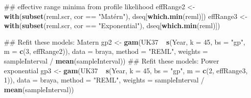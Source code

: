 \documentclass[12pt,]{article}
\newenvironment{Shaded}{\begin{snugshade}}{\end{snugshade}}
\newcommand{\KeywordTok}[1]{\textcolor[rgb]{0.13,0.29,0.53}{\textbf{{#1}}}}
\newcommand{\DataTypeTok}[1]{\textcolor[rgb]{0.13,0.29,0.53}{{#1}}}
\newcommand{\DecValTok}[1]{\textcolor[rgb]{0.00,0.00,0.81}{{#1}}}
\newcommand{\StringTok}[1]{\textcolor[rgb]{0.31,0.60,0.02}{{#1}}}
\newcommand{\NormalTok}[1]{{#1}}
\begin{document}
\begin{Shaded}
\begin{Highlighting}[]
\NormalTok{## effective range minima from profile likelihood}
\NormalTok{effRange2 <-}\StringTok{ }\KeywordTok{with}\NormalTok{(}\KeywordTok{subset}\NormalTok{(reml.scr, cor ==}\StringTok{ "Matérn"}\NormalTok{), dseq[}\KeywordTok{which.min}\NormalTok{(reml)])}
\NormalTok{effRange3 <-}\StringTok{ }\KeywordTok{with}\NormalTok{(}\KeywordTok{subset}\NormalTok{(reml.scr, cor ==}\StringTok{ "Exponential"}\NormalTok{), dseq[}\KeywordTok{which.min}\NormalTok{(reml)])}

\NormalTok{## Refit these models: Matern}
\NormalTok{gp2 <-}\StringTok{ }\KeywordTok{gam}\NormalTok{(UK37 ~}\StringTok{ }\KeywordTok{s}\NormalTok{(Year, }\DataTypeTok{k =} \DecValTok{45}\NormalTok{, }\DataTypeTok{bs =} \StringTok{"gp"}\NormalTok{, }\DataTypeTok{m =} \KeywordTok{c}\NormalTok{(}\DecValTok{3}\NormalTok{, effRange2)),}
           \DataTypeTok{data =} \NormalTok{braya,}
           \DataTypeTok{method =} \StringTok{"REML"}\NormalTok{, }\DataTypeTok{weights =} \NormalTok{sampleInterval /}\StringTok{ }\KeywordTok{mean}\NormalTok{(sampleInterval))}
\NormalTok{## Refit these models: Power exponential}
\NormalTok{gp3 <-}\StringTok{ }\KeywordTok{gam}\NormalTok{(UK37 ~}\StringTok{ }\KeywordTok{s}\NormalTok{(Year, }\DataTypeTok{k =} \DecValTok{45}\NormalTok{, }\DataTypeTok{bs =} \StringTok{"gp"}\NormalTok{, }\DataTypeTok{m =} \KeywordTok{c}\NormalTok{(}\DecValTok{2}\NormalTok{, effRange3, }\DecValTok{1}\NormalTok{)),}
           \DataTypeTok{data =} \NormalTok{braya,}
           \DataTypeTok{method =} \StringTok{"REML"}\NormalTok{, }\DataTypeTok{weights =} \NormalTok{sampleInterval /}\StringTok{ }\KeywordTok{mean}\NormalTok{(sampleInterval))}


\end{Highlighting}
\end{Shaded}
\end{document}
